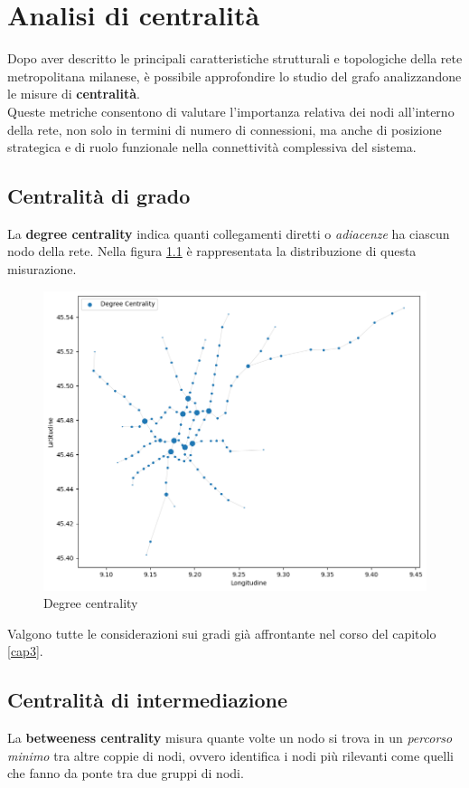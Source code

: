 \chapter{Analisi di centralità}
\label{cap4}
Dopo aver descritto le principali caratteristiche strutturali e topologiche della rete metropolitana milanese, è possibile approfondire lo studio del grafo analizzandone le misure di \textbf{centralità}. \\
Queste metriche consentono di valutare l’importanza relativa dei nodi all’interno della rete, non solo in termini di numero di connessioni, ma anche di posizione strategica e di ruolo funzionale nella connettività complessiva del sistema.

\section{Centralità di grado}
La \textbf{degree centrality} indica quanti collegamenti diretti o \textit{adiacenze} ha ciascun nodo della rete. Nella figura \ref{fig: Degree Centrality} è rappresentata la distribuzione di questa misurazione.

\vspace{1em}
\begin{figure}[h!]
    \centering
    \includegraphics[width=0.8\linewidth]{Immagini//Capitoli//cap4/degree_centr.png}
    \caption{Degree centrality}
    \label{fig: Degree Centrality}
\end{figure}
\vspace{1em}

Valgono tutte le considerazioni sui gradi già affrontante nel corso del capitolo \ref{cap3}.


\section{Centralità di intermediazione}
La \textbf{betweeness centrality} misura quante volte un nodo si trova in un \textit{percorso minimo} tra altre coppie di nodi, ovvero identifica i nodi più rilevanti come quelli che fanno da ponte tra due gruppi di nodi.

